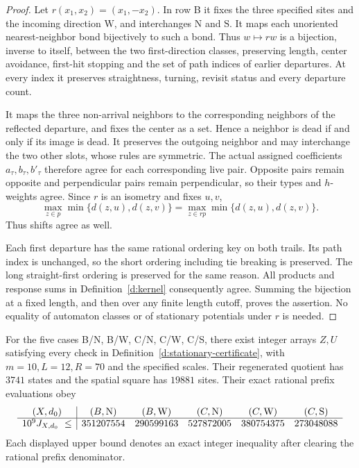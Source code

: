 \begin{proof}
Let \(r(x_1,x_2)=(x_1,-x_2)\). In row B it fixes the three
specified sites and the incoming direction \(\mathrm W\), and
interchanges \(\mathrm N\) and \(\mathrm S\). It maps each
unoriented nearest-neighbor bond bijectively to such a bond. Thus
\(w\mapsto rw\) is a bijection, inverse to itself, between the
two first-direction classes, preserving length, center avoidance,
first-hit stopping and the set of path indices of earlier
departures. At every index it preserves straightness, turning,
revisit status and every departure count.

It maps the three non-arrival neighbors to the corresponding
neighbors of the reflected departure, and fixes the center as a
set. Hence a neighbor is dead if and only if its image is dead.
It preserves the outgoing neighbor and may interchange the two
other slots, whose rules are symmetric. The actual assigned
coefficients \(a_\tau,b_\tau,b'_\tau\) therefore agree for each
corresponding live pair. Opposite pairs remain opposite and
perpendicular pairs remain perpendicular, so their types and
\(h\)-weights agree. Since \(r\) is an isometry and fixes \(u,v\),
\[
 \max_{z\in p}\min\{d(z,u),d(z,v)\}
 =\max_{z\in rp}\min\{d(z,u),d(z,v)\}.
\]
Thus shifts agree as well.

Each first departure has the same rational ordering key on both
trails. Its path index is unchanged, so the short ordering including
tie breaking is preserved. The long straight-first ordering is
preserved for the same reason. All products and response sums
in Definition~\ref{d:kernel} consequently agree. Summing the
bijection at a fixed length, and then over any finite length cutoff,
proves the assertion. No equality of automaton classes or of
stationary potentials under \(r\) is needed.
\end{proof}

\begin{proposition}\label{p:stationary-check}
For the five cases B/N, B/W, C/N, C/W, C/S, there exist
integer arrays \(Z,U\) satisfying every check in
Definition~\ref{d:stationary-certificate}, with
\(m=10,L=12,R=70\) and the specified scales.
Their regenerated quotient has \(3741\) states and the spatial
square has \(19881\) sites. Their exact rational prefix evaluations obey
\[
 \begin{array}{c|ccccc}
 (X,d_0)&(B,{\rm N})&(B,{\rm W})&(C,{\rm N})&(C,{\rm W})&(C,{\rm S})\\ \hline
 10^9J_{X,d_0}\ \le&
 351207554&290599163&527872005&380754375&273048088
 \end{array}
\]
Each displayed upper bound denotes an exact integer inequality
after clearing the rational prefix denominator.
\end{proposition}

